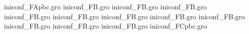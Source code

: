 iniconf_FApbc.gro
iniconf_FB.gro
iniconf_FB.gro
iniconf_FB.gro
iniconf_FB.gro
iniconf_FB.gro
iniconf_FB.gro
iniconf_FB.gro
iniconf_FB.gro
iniconf_FB.gro
iniconf_FB.gro
iniconf_FB.gro
iniconf_FCpbc.gro
